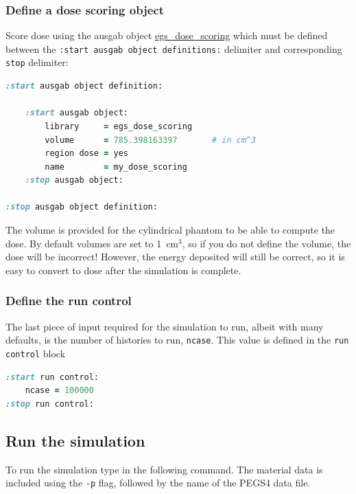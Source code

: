 \documentclass[12pt,twoside]{article}
\begin{document}
\subsubsection{Define a dose scoring object}

Score dose using the ausgab object \href{http://nrc-cnrc.github.io/EGSnrc/doc/pirs898/classEGS__DoseScoring.html}{egs\_dose\_scoring} which must be defined between the \Verb+:start ausgab object definitions:+ delimiter and corresponding \Verb+stop+ delimiter:
\vspace{2ex}

\begin{lstlisting}[language=ruby,backgroundcolor=\color{white}]
:start ausgab object definition:

    :start ausgab object:
        library     = egs_dose_scoring
        volume      = 785.398163397       # in cm^3
        region dose = yes
        name        = my_dose_scoring
    :stop ausgab object:

:stop ausgab object definition:
\end{lstlisting}

The volume is provided for the cylindrical phantom to be able to compute
the dose. By default volumes are set to 1~cm$\!^3$, so if you do not define the volume, the dose will be incorrect! However, the energy deposited will still be correct, so it is easy to convert to dose after the simulation is complete.

\subsubsection{Define the run control}

The last piece of input required for the simulation to run, albeit with many
defaults, is the number of histories to run, \Verb+ncase+. This value is defined in the \Verb+run control+ block

\begin{lstlisting}[language=ruby,backgroundcolor=\color{white}]
:start run control:
    ncase = 100000
:stop run control:
\end{lstlisting}


\subsection{Run the simulation}

To run the simulation type in the following command. The material data is included using the \Verb+-p+ flag, followed by the name of the PEGS4 data file.
\end{document}
